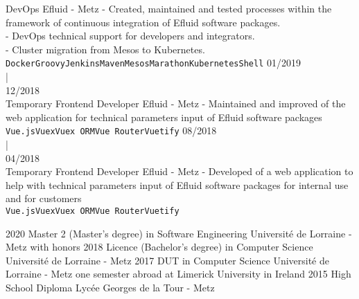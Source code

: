 \documentclass[8pt]{developercv} %
\begin{document}
\begin{entrylist}
		{DevOps}
		{Efluid - Metz}
		{- Created, maintained and tested processes within the framework of continuous integration of Efluid software packages.  \\
- DevOps technical support for developers and integrators.\\
- Cluster migration from Mesos to Kubernetes.\\
\texttt{Docker}\slashsep\texttt{Groovy}\slashsep\texttt{Jenkins}\slashsep\texttt{Maven}\slashsep\texttt{Mesos}\slashsep\texttt{Marathon}\slashsep\texttt{Kubernetes}\slashsep\texttt{Shell}}
	\entry
		{01/2019\vspace{0.1cm}\\\hspace*{0.6cm}|\vspace{0.1cm}\\ 12/2018\\\footnotesize{Temporary}}
		{Frontend Developer}
		{Efluid - Metz}
		{- Maintained and improved of the web application for technical parameters input of Efluid software packages \\ \texttt{Vue.js}\slashsep\texttt{Vuex}\slashsep\texttt{Vuex ORM}\slashsep\texttt{Vue Router}\slashsep\texttt{Vuetify}}
	\entry
		{08/2018\vspace{0.25cm}\\\hspace*{0.6cm}|\vspace{0.25cm}\\ 04/2018\\\footnotesize{Temporary}}
		{Frontend Developer}
		{Efluid - Metz}
		{- Developed of a web application to help with technical parameters input of Efluid software packages for internal use and for customers \\ \texttt{Vue.js}\slashsep\texttt{Vuex}\slashsep\texttt{Vuex ORM}\slashsep\texttt{Vue Router}\slashsep\texttt{Vuetify}}
\end{entrylist}




\begin{entrylist}
	\entry
		{2020}
		{Master 2 (Master's degree) in Software Engineering}
		{Université de Lorraine - Metz}
		{with honors}
	\entry
		{2018}
		{Licence (Bachelor's degree) in Computer Science}
		{Université de Lorraine - Metz}
		{}
	\entry
		{2017}
		{DUT in Computer Science}
		{Université de Lorraine - Metz}
		{one semester abroad at Limerick University in Ireland}
	\entry
		{2015}
		{High School Diploma}
		{Lycée Georges de la Tour - Metz}
		{}
\end{entrylist}
\end{document}
